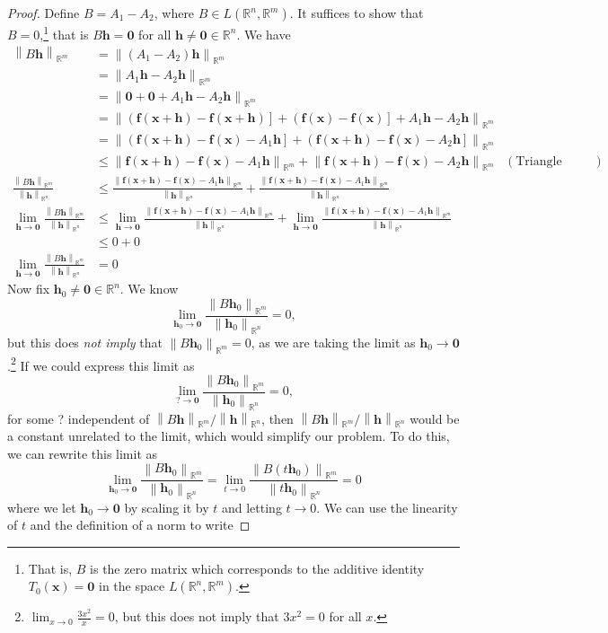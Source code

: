 \documentclass{article}
\newcommand{\R}{\mathbb{R}}
\newcommand{\x}{\mathbf{x}}
\newcommand{\f}{\mathbf{f}}
\newcommand{\h}{\mathbf{h}}
\newcommand{\ze}{\mathbf{0}}
\newcommand{\norm}[1]{\left\lVert#1\right\rVert}
\theoremstyle{definition}
\begin{document}
	\begin{proof}
		Define $ B = A_1 - A_2 $, where $ B\in L(\R^n,\R^m) $. It suffices to show that $ B = 0 $,\footnote{That is, $ B $ is the zero matrix which corresponds to the additive identity $ T_0(\x)=\ze $ in the space $ L(\R^n,\R^m) $. } that is $ B\h = \ze $ for all $ \h\neq\ze\in \R^n $. We have 
		\begin{align*}
			\norm{B\h}_{\R^m} &= \norm{(A_1 - A_2)\h}_{\R^m}\\
			& = \norm{ A_1\h -  A_2\h}_{\R^m}\\ 
			& = \norm{ \ze + \ze + A_1\h -  A_2\h}_{\R^m} \\
			& = \norm{ \left(\f(\x+\h) - \f(\x+\h)\right] +\left(\f(\x) - \f(\x)\right] + A_1\h -  A_2\h}_{\R^m} \\
			& = \norm{ \left(\f(\x+\h) - \f(\x) - A_1\h \right] +\left(\f(\x+\h) - \f(\x) - A_2\h \right]}_{\R^m}\\
			& \le \norm{\f(\x+\h) - \f(\x) - A_1\h}_{\R^m} +  \norm{\f(\x+\h) - \f(\x) - A_2\h}_{\R^m} & (\text{Triangle Inequality})
			\\\frac{\norm{B\h}_{\R^m}}{\norm{\h}_{\R^n}} & \le \frac{\norm{\f(\x+\h) - \f(\x) - A_1\h}_{\R^m} }{\norm{\h}_{\R^n}} + \frac{\norm{\f(\x+\h) - \f(\x) - A_1\h}_{\R^m} }{\norm{\h}_{\R^n}}	\\ 	\lim\limits_{\mathbf h\to \ze}\frac{\norm{B\h}_{\R^m}}{\norm{\h}_{\R^n}} & \le 	\lim\limits_{\mathbf h\to \ze}\frac{\norm{\f(\x+\h) - \f(\x) - A_1\h}_{\R^m} }{\norm{\h}_{\R^n}} + 	\lim\limits_{\mathbf h\to \ze}\frac{\norm{\f(\x+\h) - \f(\x) - A_1\h}_{\R^m} }{\norm{\h}_{\R^n}}\\ & \le 0 + 0 \\\lim\limits_{\mathbf h\to \ze}\frac{\norm{B\h}_{\R^m}}{\norm{\h}_{\R^n}}& = 0
		\end{align*}
		Now fix $ \h_0\neq \ze \in \R^n $. We know $$ \lim\limits_{\mathbf h_0\to \ze}\frac{\norm{B\h_0}_{\R^m}}{\norm{\h_0}_{\R^n}}= 0,$$ but this does \textit{not imply} that $ \norm{B\h_0}_{\R^m} = 0 $, as we are taking the limit as $\mathbf h_0\to\ze$.\footnote{$ \lim_{x\to0}\frac{3x^2}{x}=0 $, but this does not imply that $ 3x^2 = 0 $ for all $ x $. } If we could express this limit as 
		$$ \lim\limits_{?\to \ze}\frac{\norm{B\h_0}_{\R^m}}{\norm{\h_0}_{\R^n}}= 0,$$ for some ? independent of ${\norm{ B\h}_{\R^m}}/{\norm{\h}_{\R^n}}$, then ${\norm{ B\h}_{\R^m}}/{\norm{\h}_{\R^n}}$ would be a constant unrelated to the limit, which would simplify our problem. To do this, we can rewrite this limit as 
		$$\lim\limits_{\mathbf h_0\to \ze}\frac{\norm{B\h_0}_{\R^m}}{\norm{\h_0}_{\R^n}}= \lim\limits_{t\to 0}\frac{\norm{B(t\h_0)}_{\R^m}}{\norm{t\h_0}_{\R^n}} = 0$$ where we let $ \h_0\to\ze $ by scaling it by $ t $ and letting $ t\to 0 $. We can use the linearity of $ t $ and the definition of a norm to write 

\end{proof}
\end{document}
